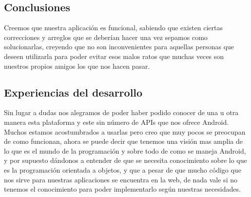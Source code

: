 \documentclass[12pt,letterpaper]{article}
\begin{document}
   
  \subsection{Conclusiones}
  
 Creemos que nuestra aplicación es funcional, sabiendo que existen ciertas correcciones y arreglos que se deberían hacer una vez sepamos como solucionarlas, creyendo que no son inconvenientes para aquellas personas que deseen utilizarla para poder evitar esos malos ratos que muchas veces son nuestros propios amigos los que nos hacen pasar.
  
  
   \subsection{Experiencias del desarrollo}
Sin lugar a dudas nos alegramos de poder haber podido conocer de una u otra manera esta plataforma y este sin número de APIs que nos ofrece Android. Muchos estamos acostumbrados a usarlas pero creo que muy pocos se preocupan de como funcionan, ahora se puede decir que tenemos una visión mas amplia de lo que es el mundo de la programación y sobre todo de como se maneja Android, y por supuesto dándonos a entender de que se necesita conocimiento sobre lo que es la programación orientada a objetos, y que a pesar de que mucho código que nos sirve para nuestras aplicaciones se encuentra en la web, de nada vale si no tenemos el conocimiento para poder implementarlo según nuestras necesidades.
\end{document}
